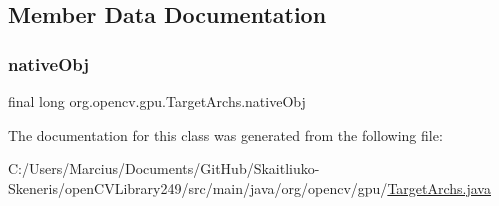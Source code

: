 \subsection{Member Data Documentation}
\mbox{\label{classorg_1_1opencv_1_1gpu_1_1_target_archs_aeed15bdb07efea2c91a2ae74f58a706d}} 
\subsubsection{\texorpdfstring{native\+Obj}{nativeObj}}
{\footnotesize\ttfamily final long org.\+opencv.\+gpu.\+Target\+Archs.\+native\+Obj\hspace{0.3cm}{\ttfamily [protected]}}



The documentation for this class was generated from the following file\+:\begin{DoxyCompactItemize}
\item 
C\+:/\+Users/\+Marcius/\+Documents/\+Git\+Hub/\+Skaitliuko-\/\+Skeneris/open\+C\+V\+Library249/src/main/java/org/opencv/gpu/\mbox{\hyperlink{_target_archs_8java}{Target\+Archs.\+java}}\end{DoxyCompactItemize}
